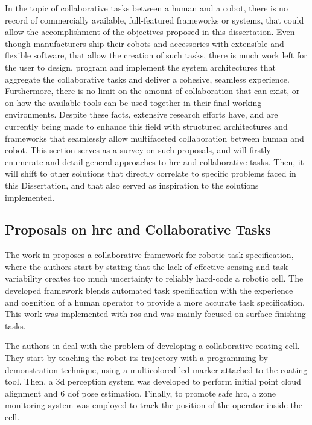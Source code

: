 \par In the topic of collaborative tasks between a human and a cobot, there is no record of  commercially available, full-featured frameworks or systems, that could allow the accomplishment of the objectives proposed in this dissertation. Even though manufacturers ship their cobots and accessories with extensible and flexible software, that allow the creation of such tasks, there is much work left for the user to design, program and implement the system architectures that aggregate the collaborative tasks and deliver a cohesive, seamless experience. Furthermore, there is no limit on the amount of collaboration that can exist, or on how the available tools can be used together in their final working environments.
Despite these facts, extensive research efforts have, and are currently being made \cite{paper.review.1, paper.review.2} to enhance this field with structured architectures and frameworks that seamlessly allow multifaceted collaboration between human and cobot. This section serves as a survey on such proposals, and will firstly enumerate and detail general approaches to \ac{hrc} and collaborative tasks. Then, it will shift to other solutions that directly correlate to specific problems faced in this Dissertation, and that also served as inspiration to the solutions implemented. 

\subsection{Proposals on \acs{hrc} and Collaborative Tasks}


\par The work in \cite{colab.framework} proposes a collaborative framework for robotic task specification, where the authors start by stating that the lack of effective sensing and task variability creates too much uncertainty to reliably hard-code a robotic cell. The developed framework blends automated task specification with the experience and cognition of a human operator to provide a more accurate task specification. This work was implemented with \ac{ros} and was mainly focused on surface finishing tasks.

\par The authors in \cite{colab.cell} deal with the problem of developing a collaborative coating cell. They start by teaching the robot its trajectory with a programming by demonstration technique, using a multicolored \acs{led} marker attached to the coating tool. Then, a \acs{3d} perception system was developed to perform initial point cloud alignment and 6 \ac{dof} pose estimation. Finally, to promote safe \ac{hrc}, a zone monitoring system was employed to track the position of the operator inside the cell.

